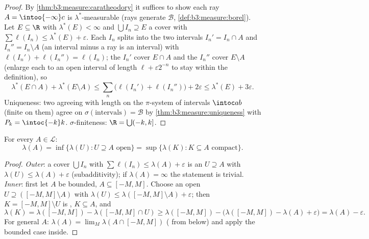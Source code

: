 \begin{proof}
By \cref{thm:b3:measure:caratheodory} it suffices to show each
ray $A = \intoo{-\infty}c$ is $\lambda^*$-measurable
(rays generate $\mathcal B$,
\cref{def:b3:measure:borel}). Let $E \subseteq \R$ with
$\lambda^*(E) < \infty$ and $\bigcup I_n \supseteq E$ a cover
with $\sum\ell(I_n) \leq \lambda^*(E) + \varepsilon$. Each
$I_n$ splits into the two intervals $I_n' = I_n \cap A$ and
$I_n'' = I_n\setminus A$ (an interval minus a ray is an
interval) with $\ell(I_n') + \ell(I_n'') = \ell(I_n)$; the
$I_n'$ cover $E \cap A$ and the $I_n''$ cover $E \setminus A$
(enlarge each to an open interval of length $\ell +
\varepsilon2^{-n}$ to stay within the definition), so
\[
\lambda^*(E\cap A) + \lambda^*(E\setminus A)
\leq \sum_n\bigl(\ell(I_n') + \ell(I_n'')\bigr) + 2\varepsilon
\leq \lambda^*(E) + 3\varepsilon .
\]
Uniqueness: two  agreeing with length on the
$\pi$-system of intervals $\intoc ab$ (finite on them) agree on
$\sigma(\text{intervals}) = \mathcal B$ by
\cref{thm:b3:measure:uniqueness} with $P_k = \intoc{-k}k$.
$\sigma$-finiteness: $\R = \bigcup(-k, k]$.
\end{proof}

\begin{theorem}[Regularity]\label{thm:b3:measure:regularity}
For every $A \in \mathcal L$:
\[
\lambda(A) = \inf\{\lambda(U) : U \supseteq A \text{ open}\}
= \sup\{\lambda(K) : K \subseteq A \text{ compact}\}.
\]
\end{theorem}

\begin{proof}
\emph{Outer}: a cover $\bigcup I_n$ with $\sum\ell(I_n) \leq
\lambda(A) + \varepsilon$ is an  $U \supseteq A$ with
$\lambda(U) \leq \lambda(A) + \varepsilon$ (subadditivity); if
$\lambda(A) = \infty$ the statement is trivial. \emph{Inner}:
first let $A$ be bounded, $A \subseteq [-M, M]$. Choose an open
$U \supseteq ([-M,M]\setminus A)$ with $\lambda(U) \leq
\lambda([-M,M]\setminus A) + \varepsilon$; then $K = [-M,
M]\setminus U$ is , $K \subseteq A$, and
\[
\lambda(K) = \lambda([-M,M]) - \lambda([-M,M]\cap U)
\geq \lambda([-M,M]) - \bigl(\lambda([-M,M]) - \lambda(A) +
\varepsilon\bigr) = \lambda(A) - \varepsilon .
\]
For general $A$: $\lambda(A) = \lim_M\lambda(A\cap[-M,M])$
( from below) and apply the bounded case inside.
\end{proof}

